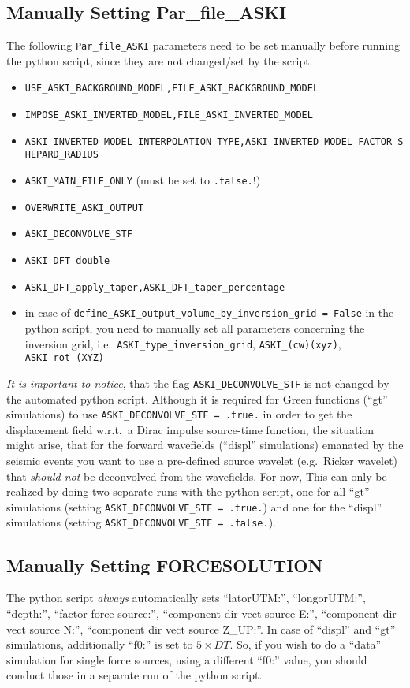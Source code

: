 \documentclass[12pt,a4paper]{article}
\newcommand{\lcode}[1]{\nolinkurl{#1}}
\newcommand{\lcodetitle}[1]{ {\ttfamily #1} }
\begin{document}
\subsection{Manually Setting \lcodetitle{Par\_file\_ASKI}}
The following \lcode{Par_file_ASKI} parameters need to be set manually before running the python script, 
since they are not changed/set by the script.
\begin{itemize}
\item \lcode{USE_ASKI_BACKGROUND_MODEL,FILE_ASKI_BACKGROUND_MODEL}
\item \lcode{IMPOSE_ASKI_INVERTED_MODEL,FILE_ASKI_INVERTED_MODEL}
\item \lcode{ASKI_INVERTED_MODEL_INTERPOLATION_TYPE,ASKI_INVERTED_MODEL_FACTOR_SHEPARD_RADIUS}
\item \lcode{ASKI_MAIN_FILE_ONLY} (must be set to \lcode{.false.}!)
\item \lcode{OVERWRITE_ASKI_OUTPUT}
\item \lcode{ASKI_DECONVOLVE_STF}
\item \lcode{ASKI_DFT_double}
\item \lcode{ASKI_DFT_apply_taper,ASKI_DFT_taper_percentage}
\item in case of \lcode{define_ASKI_output_volume_by_inversion_grid = False} in the python script, 
  you need to manually set all parameters concerning the inversion grid, i.e.\ \lcode{ASKI_type_inversion_grid}, 
  \lcode{ASKI_(cw)(xyz)}, \lcode{ASKI_rot_(XYZ)}
\end{itemize}
\emph{It is important to notice}, that the flag \lcode{ASKI_DECONVOLVE_STF} is not changed by 
the automated python script. Although it is required for Green functions (``gt'' simulations) to use 
\lcode{ASKI_DECONVOLVE_STF = .true.} in order to get the displacement field w.r.t.\ a Dirac impulse
source-time function, the situation might arise, that for the forward wavefields (``displ'' simulations) 
emanated by the seismic events you want to use a pre-defined source wavelet (e.g.\ Ricker wavelet) 
that \emph{should not} be deconvolved from the wavefields. 
For now, This can only be realized by doing two separate runs
with the python script, one for all ``gt'' simulations (setting \lcode{ASKI_DECONVOLVE_STF = .true.}) 
and one for the ``displ'' simulations (setting \lcode{ASKI_DECONVOLVE_STF = .false.}).

%
\subsection{Manually Setting \lcodetitle{FORCESOLUTION}}
%
The python script \emph{always} automatically sets ``latorUTM:'', ``longorUTM:'', ``depth:'', 
``factor force source:'', ``component dir vect source E:'', ``component dir vect source N:'', 
``component dir vect source Z\_UP:''. In case of ``displ'' and ``gt'' simulations, additionally ``f0:'' 
is set to $5\times DT$.
So, if you wish to do a ``data'' simulation for single force sources, using a different ``f0:'' value, you 
should conduct those in a separate run of the python script.
\end{document}
